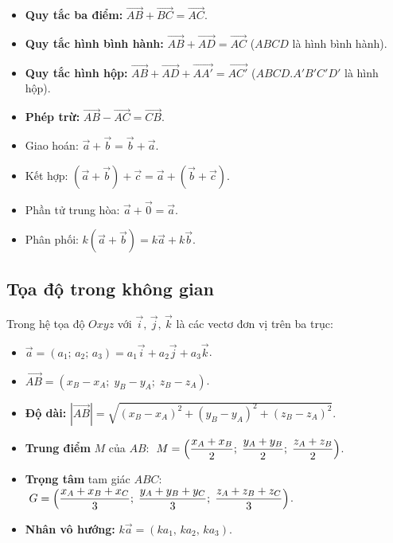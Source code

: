 \documentclass[12pt,a4paper]{article}
\begin{document}
\begin{congthuc}[title={Các quy tắc cộng, trừ}]
  \begin{itemize}
    \item \textbf{Quy tắc ba điểm:} $\overrightarrow{AB} + \overrightarrow{BC} = \overrightarrow{AC}$.
    \item \textbf{Quy tắc hình bình hành:} $\overrightarrow{AB} + \overrightarrow{AD} = \overrightarrow{AC}$ \;($ABCD$ là hình bình hành).
    \item \textbf{Quy tắc hình hộp:} $\overrightarrow{AB} + \overrightarrow{AD} + \overrightarrow{AA'} = \overrightarrow{AC'}$ \;($ABCD.A'B'C'D'$ là hình hộp).
    \item \textbf{Phép trừ:} $\overrightarrow{AB} - \overrightarrow{AC} = \overrightarrow{CB}$.
  \end{itemize}
\end{congthuc}

\begin{tinhchat}
  \begin{itemize}
    \item Giao hoán: $\vec{a} + \vec{b} = \vec{b} + \vec{a}$.
    \item Kết hợp: $(\vec{a} + \vec{b}) + \vec{c} = \vec{a} + (\vec{b} + \vec{c})$.
    \item Phần tử trung hòa: $\vec{a} + \vec{0} = \vec{a}$.
    \item Phân phối: $k(\vec{a} + \vec{b}) = k\vec{a} + k\vec{b}$.
  \end{itemize}
\end{tinhchat}

\subsection{Tọa độ trong không gian}

\begin{congthuc}
  Trong hệ tọa độ $Oxyz$ với $\vec{i},\, \vec{j},\, \vec{k}$ là các vectơ đơn vị trên ba trục:
  \begin{itemize}
    \item $\vec{a} = (a_1;\, a_2;\, a_3) = a_1\vec{i} + a_2\vec{j} + a_3\vec{k}$.
    \item $\overrightarrow{AB} = (x_B - x_A;\; y_B - y_A;\; z_B - z_A)$.
    \item \textbf{Độ dài:} $|\overrightarrow{AB}| = \sqrt{(x_B - x_A)^2 + (y_B - y_A)^2 + (z_B - z_A)^2}$.
    \item \textbf{Trung điểm} $M$ của $AB$:
      $\;M = \Bigl(\dfrac{x_A + x_B}{2};\; \dfrac{y_A + y_B}{2};\; \dfrac{z_A + z_B}{2}\Bigr)$.
    \item \textbf{Trọng tâm} tam giác $ABC$:
      $\;G = \Bigl(\dfrac{x_A + x_B + x_C}{3};\; \dfrac{y_A + y_B + y_C}{3};\; \dfrac{z_A + z_B + z_C}{3}\Bigr)$.
    \item \textbf{Nhân vô hướng:} $k\vec{a} = (ka_1,\, ka_2,\, ka_3)$.
  \end{itemize}
\end{congthuc}
\end{document}
